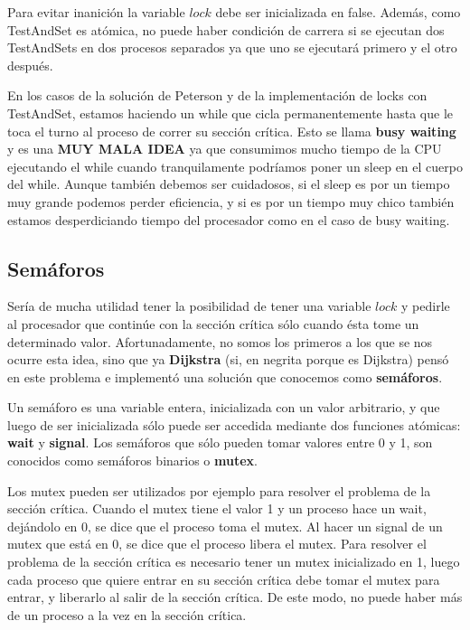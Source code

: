 \documentclass{article}
\begin{document}
Para evitar inanici\'on la variable $lock$ debe ser inicializada en false. Adem\'as, como TestAndSet es at\'omica, no puede haber condici\'on de carrera si se ejecutan dos TestAndSets en dos procesos separados ya que uno se ejecutar\'a primero y el otro despu\'es.

En los casos de la soluci\'on de Peterson y de la implementaci\'on de locks con TestAndSet, estamos haciendo un while que cicla permanentemente hasta que le toca el turno al proceso de correr su secci\'on cr\'itica. Esto se llama \textbf{busy waiting} y es una \textbf{MUY MALA IDEA} ya que consumimos mucho tiempo de la CPU ejecutando el while cuando tranquilamente podr\'iamos poner un sleep en el cuerpo del while. Aunque tambi\'en debemos ser cuidadosos, si el sleep es por un tiempo muy grande podemos perder eficiencia, y si es por un tiempo muy chico tambi\'en estamos desperdiciando tiempo del procesador como en el caso de busy waiting.

\subsection{Sem\'aforos}

Ser\'ia de mucha utilidad tener la posibilidad de tener una variable $lock$ y pedirle al procesador que contin\'ue con la secci\'on cr\'itica s\'olo cuando \'esta tome un determinado valor. Afortunadamente, no somos los primeros a los que se nos ocurre esta idea, sino que ya \textbf{Dijkstra} (si, en negrita porque es Dijkstra) pens\'o en este problema e implement\'o una soluci\'on que conocemos como \textbf{sem\'aforos}.

Un sem\'aforo es una variable entera, inicializada con un valor arbitrario, y que luego de ser inicializada s\'olo puede ser accedida mediante dos funciones atómicas: \textbf{wait} y \textbf{signal}. Los semáforos que s\'olo pueden tomar valores entre 0 y 1, son conocidos como sem\'aforos binarios o \textbf{mutex}.

Los mutex pueden ser utilizados por ejemplo para resolver el problema de la secci\'on cr\'itica. Cuando el mutex tiene el valor 1 y un proceso hace un wait, dej\'andolo en 0, se dice que el proceso toma el mutex. Al hacer un signal de un mutex que est\'a en 0, se dice que el proceso libera el mutex. Para resolver el problema de la secci\'on cr\'itica es necesario tener un mutex inicializado en 1, luego cada proceso que quiere entrar en su secci\'on cr\'itica debe tomar el mutex para entrar, y liberarlo al salir de la secci\'on cr\'itica. De este modo, no puede haber m\'as de un proceso a la vez en la secci\'on cr\'itica.
\end{document}

